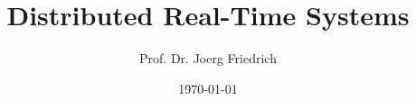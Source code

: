 
\usepackage[utf8]{inputenc}
\usepackage[ngerman]{babel} %
\usepackage[T1]{fontenc}    %
\usepackage{textcomp}       %
\usepackage{mathptmx}              %
\usepackage[scaled=.90]{helvet}    %

\usepackage{booktabs}
\usepackage{multimedia}
\usepackage{listings}
\usepackage{enumerate}



\vspace*{1ex}


\title{Distributed Real-Time Systems}


\author{Prof. Dr. Joerg Friedrich
\and
 }




\date[\copyright{} 2011]{\today}

